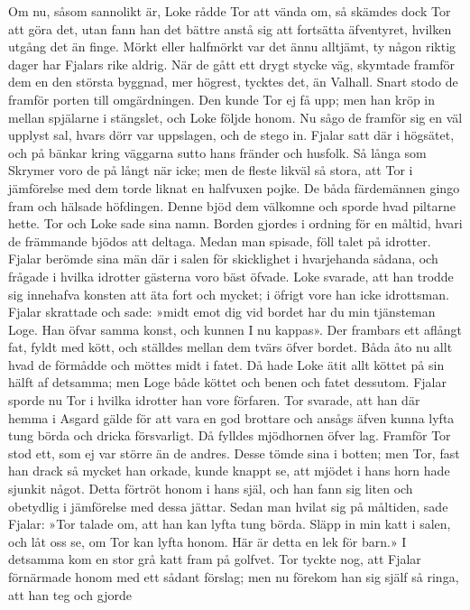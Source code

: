 Om nu, såsom sannolikt är, Loke rådde Tor att vända om, så skämdes dock
Tor att göra det, utan fann han det bättre anstå sig att fortsätta
äfventyret, hvilken utgång det än finge. Mörkt eller halfmörkt var det
ännu alltjämt, ty någon riktig dager har Fjalars rike aldrig. När de
gått ett drygt stycke väg, skymtade framför dem en den största byggnad,
mer högrest, tycktes det, än Valhall. Snart stodo de framför porten till
omgärdningen. Den kunde Tor ej få upp; men han kröp in mellan spjälarne
i stängslet, och Loke följde honom. Nu sågo de framför sig en väl
upplyst sal, hvars dörr var uppslagen, och de stego in. Fjalar satt där
i högsätet, och på bänkar kring väggarna sutto hans fränder och husfolk.
Så långa som Skrymer voro de på långt när icke; men de fleste likväl så
stora, att Tor i jämförelse med dem torde liknat en halfvuxen pojke. De
båda färdemännen gingo fram och hälsade höfdingen. Denne bjöd dem
välkomne och sporde hvad piltarne hette. Tor och Loke sade sina namn.
Borden gjordes i ordning för en måltid, hvari de främmande bjödos att
deltaga. Medan man spisade,
föll talet på idrotter. Fjalar berömde sina män där i salen för
skicklighet i hvarjehanda sådana, och frågade i hvilka idrotter gästerna
voro bäst öfvade. Loke svarade, att han trodde sig innehafva konsten att
äta fort och mycket; i öfrigt vore han icke idrottsman. Fjalar skrattade
och sade: »midt emot dig vid bordet har du min tjänsteman Loge. Han
öfvar samma konst, och kunnen I nu kappas». Der frambars ett aflångt
fat, fyldt med kött, och ställdes mellan dem tvärs öfver bordet. Båda
åto nu allt hvad de förmådde och möttes midt i fatet. Då hade Loke ätit
allt köttet på sin hälft af detsamma; men Loge både köttet och benen och
fatet dessutom. Fjalar sporde nu Tor i hvilka idrotter han vore
förfaren. Tor svarade, att han där hemma i Asgard gälde för att vara en
god brottare och ansågs äfven kunna lyfta tung börda och dricka
försvarligt. Då fylldes mjödhornen öfver lag. Framför Tor stod ett, som
ej var större än de andres. Desse tömde sina i botten; men Tor, fast han
drack så mycket han orkade, kunde knappt se, att mjödet i hans horn hade
sjunkit något. Detta förtröt honom i hans själ, och han fann sig liten
och obetydlig i jämförelse med dessa jättar. Sedan man hvilat sig på
måltiden, sade Fjalar: »Tor talade om, att han kan lyfta tung börda.
Släpp in min katt i salen, och låt oss se, om Tor kan lyfta honom. Här
är detta en lek för barn.» I detsamma kom en stor grå katt fram på
golfvet. Tor tyckte nog, att Fjalar förnärmade honom med ett sådant
förslag; men nu förekom han sig själf så ringa, att han teg och gjorde
